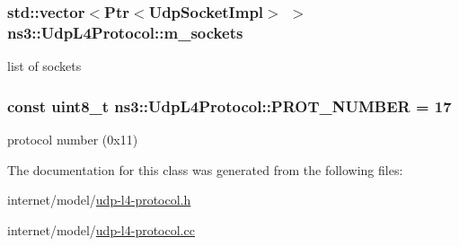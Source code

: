 \subsubsection[{\texorpdfstring{m\+\_\+sockets}{m_sockets}}]{\setlength{\rightskip}{0pt plus 5cm}std\+::vector$<${\bf Ptr}$<${\bf Udp\+Socket\+Impl}$>$ $>$ ns3\+::\+Udp\+L4\+Protocol\+::m\+\_\+sockets\hspace{0.3cm}{\ttfamily [private]}}\hypertarget{classns3_1_1UdpL4Protocol_aaa39062111e636c000289b1305460094}{}\label{classns3_1_1UdpL4Protocol_aaa39062111e636c000289b1305460094}


list of sockets 

\subsubsection[{\texorpdfstring{P\+R\+O\+T\+\_\+\+N\+U\+M\+B\+ER}{PROT_NUMBER}}]{\setlength{\rightskip}{0pt plus 5cm}const uint8\+\_\+t ns3\+::\+Udp\+L4\+Protocol\+::\+P\+R\+O\+T\+\_\+\+N\+U\+M\+B\+ER = 17\hspace{0.3cm}{\ttfamily [static]}}\hypertarget{classns3_1_1UdpL4Protocol_ad370801b3d1a166e831020a777c41047}{}\label{classns3_1_1UdpL4Protocol_ad370801b3d1a166e831020a777c41047}


protocol number (0x11) 



The documentation for this class was generated from the following files\+:\begin{DoxyCompactItemize}
\item 
internet/model/\hyperlink{udp-l4-protocol_8h}{udp-\/l4-\/protocol.\+h}\item 
internet/model/\hyperlink{udp-l4-protocol_8cc}{udp-\/l4-\/protocol.\+cc}\end{DoxyCompactItemize}
